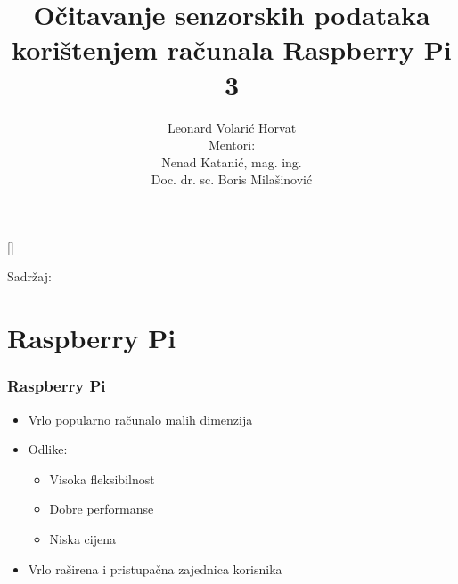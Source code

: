 \documentclass[12pt]{beamer}
\date{}
\title[]{Očitavanje senzorskih podataka korištenjem računala Raspberry Pi 3}
\author[Leonard Volarić Horvat]{Leonard Volarić Horvat\\ Mentori: \\ Nenad Katanić, mag. ing.\\
Doc. dr. sc. Boris Milašinović}
\institute[FER]{Sveučilište u Zagrebu\\Fakultet elektrotehnike i računarstva}
\begin{document}
{
	\begin{frame}
		\maketitle
	\end{frame}
}

\begin{frame}
	Sadržaj:
	\tableofcontents
\end{frame}

\section{Raspberry Pi}
\begin{frame}
\frametitle{Raspberry Pi}
	\begin{itemize}
		\item Vrlo popularno računalo malih dimenzija
		\item Odlike:
		\begin{itemize}
			\item Visoka fleksibilnost
			\item Dobre performanse
			\item Niska cijena
		\end{itemize}
		\item Vrlo raširena i pristupačna zajednica korisnika
	\end{itemize}
\end{frame}
\end{document}
